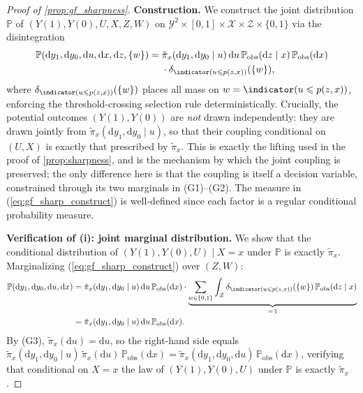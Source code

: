 \begin{proof}[Proof of \cref{prop:gf_sharpness}]
    \medskip
    \noindent\textbf{Construction.}
    We construct the joint distribution $\mathbb{P}$ of $(Y(1), Y(0), U, X, Z, W)$ on $\mathcal{Y}^2 \times [0,1] \times \mathcal{X} \times \mathcal{Z} \times \{0,1\}$ via the disintegration
    \begin{equation}\label{eq:gf_sharp_construct}
        \begin{split}
            \mathbb{P}(\mathrm{d}y_1, \mathrm{d}y_0, \mathrm{d}u, \mathrm{d}x, \mathrm{d}z, \{w\})
            = \;& \tilde{\pi}_x(\mathrm{d}y_1, \mathrm{d}y_0 \mid u)\, \mathrm{d}u\, \mathbb{P}_{\text{obs}}(\mathrm{d}z \mid x)\, \mathbb{P}_{\text{obs}}(\mathrm{d}x)\\
                & \cdot \delta_{\indicator(u \leqslant p(z,x))}(\{w\}),
        \end{split}
    \end{equation}
    where $\delta_{\indicator(u \leqslant p(z,x))}(\{w\})$ places all mass on $w = \indicator(u \leqslant p(z,x))$, enforcing the threshold-crossing selection rule deterministically. Crucially, the potential outcomes $(Y(1), Y(0))$ are \emph{not} drawn independently: they are drawn jointly from $\tilde{\pi}_x(\mathrm{d}y_1, \mathrm{d}y_0 \mid u)$, so that their coupling conditional on $(U, X)$ is exactly that prescribed by $\tilde{\pi}_x$. This is exactly the lifting used in the proof of \cref{prop:sharpness}, and is the mechanism by which the joint coupling is preserved; the only difference here is that the coupling is itself a decision variable, constrained through its two marginals in (G1)--(G2). The measure in (\ref{eq:gf_sharp_construct}) is well-defined since each factor is a regular conditional probability measure.

    \medskip
    \noindent\textbf{Verification of (i): joint marginal distribution.}
    We show that the conditional distribution of $(Y(1), Y(0), U) \mid X = x$ under $\mathbb{P}$ is exactly $\tilde{\pi}_x$. Marginalizing (\ref{eq:gf_sharp_construct}) over $(Z, W)$:
    \begin{align*}
        \mathbb{P}(\mathrm{d}y_1, \mathrm{d}y_0, \mathrm{d}u, \mathrm{d}x)
        &= \tilde{\pi}_x(\mathrm{d}y_1, \mathrm{d}y_0 \mid u)\, \mathrm{d}u\, \mathbb{P}_{\text{obs}}(\mathrm{d}x) \cdot \underbrace{\sum_{w \in \{0,1\}} \int_{\mathcal{Z}} \delta_{\indicator(u \leqslant p(z,x))}(\{w\})\, \mathbb{P}_{\text{obs}}(\mathrm{d}z \mid x)}_{=\,1}\\
        &= \tilde{\pi}_x(\mathrm{d}y_1, \mathrm{d}y_0 \mid u)\, \mathrm{d}u\, \mathbb{P}_{\text{obs}}(\mathrm{d}x).
    \end{align*}
    By (G3), $\tilde{\pi}_x(\mathrm{d}u) = \mathrm{d}u$, so the right-hand side equals $\tilde{\pi}_x(\mathrm{d}y_1, \mathrm{d}y_0 \mid u)\, \tilde{\pi}_x(\mathrm{d}u)\, \mathbb{P}_{\text{obs}}(\mathrm{d}x) = \tilde{\pi}_x(\mathrm{d}y_1, \mathrm{d}y_0, \mathrm{d}u)\, \mathbb{P}_{\text{obs}}(\mathrm{d}x)$, verifying that conditional on $X = x$ the law of $(Y(1), Y(0), U)$ under $\mathbb{P}$ is exactly $\tilde{\pi}_x$.


\end{proof}
